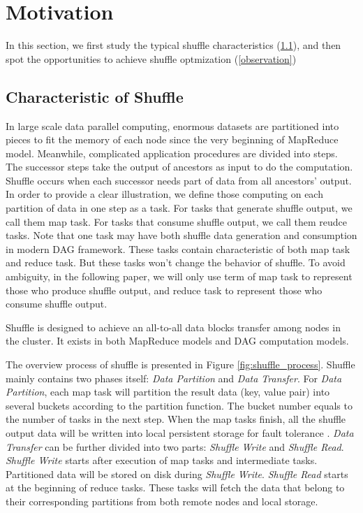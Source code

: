 \section{Motivation}

In this section, we first study the typical shuffle characteristics (\ref{shuffle pattern}), and then spot the opportunities to achieve shuffle optmization (\ref{observation})
\subsection{Characteristic of Shuffle} \label{shuffle pattern}

In large scale data parallel computing, enormous datasets are partitioned into pieces to fit the memory of each node since the very beginning of MapReduce\cite{mapreduce} model.
Meanwhile, complicated application procedures are divided into steps. The successor steps take the output of ancestors as input to do the computation. Shuffle occurs when each successor needs 
part of data from all ancestors' output. In order to provide a clear illustration, we define those computing on each partition of data in one step as a task. For tasks that generate shuffle output, we call
them map task. For tasks that consume shuffle output, we call them reudce tasks. Note that one task may have both shuffle data generation and consumption in modern DAG framework. These tasks contain characteristic of both map task and reduce task. But these tasks won't change the behavior of shuffle. To avoid ambiguity, in the following paper, we will only use term of map task to represent those who produce shuffle output, and reduce task to represent those who consume shuffle output.

Shuffle is designed to achieve an all-to-all data blocks transfer among nodes in the cluster. It exists in both MapReduce models and DAG computation models.

The overview process of shuffle is presented in Figure \ref{fig:shuffle_process}. Shuffle mainly contains two phases itself: \textit{Data Partition} and \textit{Data Transfer}. For \textit{Data Partition}, each map task will partition the result data (key, value pair) into several buckets according to the partition function.
The bucket number equals to the number of tasks in the next step. When the map tasks finish, all the shuffle output data will be written into local persistent storage for fault tolerance \cite{mapreduce, spark}.
\textit{Data Transfer} can be further divided into two parts: \textit{Shuffle Write} and \textit{Shuffle Read}. \textit{Shuffle Write} starts after execution of map tasks and intermediate tasks. Partitioned data will  be stored on disk during \textit{Shuffle Write}. \textit{Shuffle Read} starts at the beginning of reduce tasks. These tasks will fetch the data that belong to their corresponding partitions from both remote nodes and local storage.

